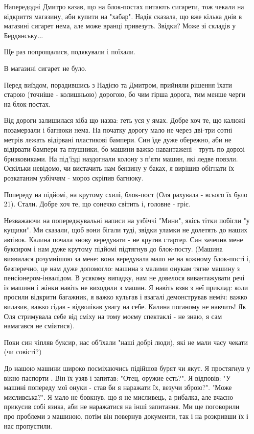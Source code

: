 Напередодні Дмитро казав, що на блок-постах питають сигарети, тож чекали на
відкриття магазину, аби купити на "хабар". Надія сказала, що вже кілька днів в
магазині сигарет нема, але може вранці привезуть. Звідки? Може зі складів у
Бердянську...

Ще раз попрощалися, подякували і поїхали.

В магазині сигарет не було. 

Перед виїздом, порадившись з Надією та Дмитром, прийняли рішення їхати старою
(точніше - колишньою) дорогою, бо чим гірша дорога, тим менше черги на
блок-постах.

Від дороги залишилася хіба що назва: геть уся у ямах. Добре хоч те, що калюжі
позамерзали і багнюки нема. На початку дорогу мало не через дві-три сотні
метрів лежать відірвані пластикові бампери. Син їде дуже обережно, аби не
відірвати бампери та глушники, бо машини важко навантажені - труть по дорозі
бризковиками.  На під'їзді наздогнали колону з п'яти машин, які ледве повзли.
Оскільки невідомо, чи вистачить нам бензину у баках, я вирішив обігнати їх
розкатаним узбіччям - мороз скріпив багнюку. 

Попереду на підйомі, на крутому схилі,  блок-пост (Оля рахувала - всього їх
було 21). Стали. Добре хоч те, що сонечко світить і, головне - гріє.

Незважаючи на попереджувальні написи на узбіччі "Мини", якісь тітки побігли "у
кущики". Ми сказали, щоб вони бігали туді, звідки уламки не долетять до наших
автівок. Калина почала знову вередувати - не крутив стартер. Син зачепив мене
буксиром і нам дуже крутому підйомі підтягнув до блок-посту. (Машина виявилася
розумнішою за мене: вона вередувала мало не на кожному блок-пості і,
безперечно, це нам дуже допомогло: машина з малими онукам тягне машину з
пенсіонером-інвалідом. В усякому випадку, нам не довелося вивантажувати речі із
машини і жінки навіть не виходили з машин. Я навіть взяв з неї приклад: коли
просили відкрити багажник, я важко кульгав і взагалі демонстрував неміч: важко
вилазив, важко сідав - відволікав увагу на себе. Калина поганому не навчить! Як
Оля стримувала себе від сміху на тому моєму спектаклі - не знаю, я сам
намагався не сміятися). 

Поки син чіпляв буксир, нас об'їхали "наші добрі люди), які не мали часу чекати
(чи совісті?)

До нашою машини широко посміхаючись підійшов бурят чи якут. Я простягнув у
вікно паспорти . Він їх узяв і запитав: "Отец, оружие есть?". Я відповів: "У
машині попереду мої онуки - став би я наражати їх, везучи зброю?". "Може
мисливська?". Я мало не бовкнув, що я не мисливець, а рибалка, але вчасно
прикусив собі язика, аби не наражатися на інші запитання. Ми ще поговорили про
проблеми з машиною, потім він повернув документи, так і на розкривши їх і нас
пропустили. 

